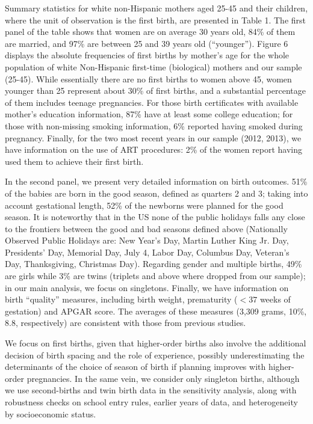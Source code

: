 \documentclass[a4paper, 12 pt]{article}
\theoremstyle{plain}
\begin{document}
\begin{doublespace}
Summary statistics for white non-Hispanic mothers aged 25-45 and their children, where the unit of observation is the first birth, are presented in Table 1. The first panel of the table shows that women are on average 30 years old, 84\% of them are married, and 97\% are between 25 and 39 years old (``younger''). Figure 6 displays the absolute frequencies of first births by mother's age for the whole population of white Non-Hispanic first-time (biological) mothers and our sample (25-45). While essentially there are no first births to women above 45, women younger than 25 represent about 30\% of first births, and a substantial percentage of them includes teenage pregnancies. For those birth certificates with available mother's education information, 87\% have at least some college education; for those with non-missing smoking information, 6\% reported having smoked during pregnancy. Finally, for the two most recent years in our sample (2012, 2013), we have information on the use of ART procedures: 2\% of the women report having used them to achieve their first birth.

In the second panel, we present very detailed information on birth outcomes. 51\% of the babies are born in the good season, defined as quarters 2 and 3; taking into account gestational length, 52\% of the newborns were planned for the good season. It is noteworthy that in the US none of the public holidays falls any close to the frontiers between the good and bad seasons defined above (Nationally Observed Public Holidays are: New Year's Day, Martin Luther King Jr. Day, Presidents' Day, Memorial Day, July 4, Labor Day, Columbus Day, Veteran's Day, Thanksgiving, Christmas Day). Regarding gender and multiple births, 49\% are girls while 3\% are twins (triplets and above where dropped from our sample); in our main analysis, we focus on singletons. Finally, we have information on birth ``quality'' measures, including birth weight, prematurity ($<37$ weeks of gestation) and APGAR score. The averages of these measures (3,309 grams, 10\%, 8.8, respectively) are consistent with those from previous studies.

We focus on first births, given that higher-order births also involve the additional decision of birth spacing and the role of experience, possibly underestimating the determinants of the choice of season of birth if planning improves with higher-order pregnancies. In the same vein, we consider only singleton births, although we use second-births and twin birth data in the sensitivity analysis, along with robustness checks on school entry rules, earlier years of data, and heterogeneity by socioeconomic status.


\end{doublespace}
\end{document}
